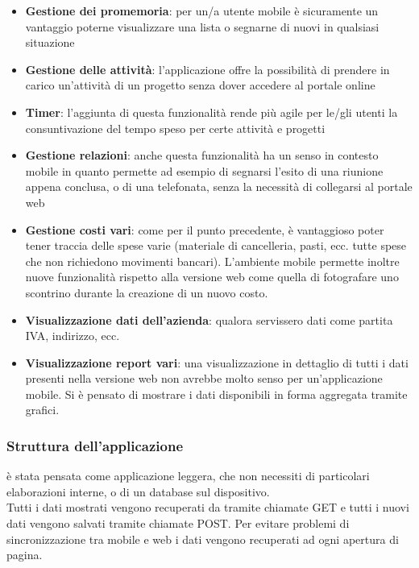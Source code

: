 \begin{itemize}
\item \textbf{Gestione dei promemoria}: per un/a utente mobile è sicuramente un vantaggio
poterne visualizzare una lista o segnarne di nuovi in qualsiasi situazione
\item \textbf{Gestione delle attività}: l'applicazione offre la possibilità di prendere
in carico un'attività di un progetto senza dover accedere al portale online
\item \textbf{Timer}: l'aggiunta di questa funzionalità rende più agile per le/gli utenti
la consuntivazione del tempo speso per certe attività e progetti
\item \textbf{Gestione relazioni}: anche questa funzionalità ha un senso in contesto mobile
in quanto permette ad esempio di segnarsi l'esito di una riunione appena conclusa, o di una
telefonata, senza la necessità di collegarsi al portale web
\item \textbf{Gestione costi vari}: come per il punto precedente, è vantaggioso poter tener
traccia delle spese varie (materiale di cancelleria, pasti, ecc. tutte spese che non
richiedono movimenti bancari). L'ambiente mobile permette inoltre nuove funzionalità rispetto
alla versione web come quella di fotografare uno scontrino durante la creazione di un nuovo
costo.
\item \textbf{Visualizzazione dati dell'azienda}: qualora servissero dati come partita IVA,
indirizzo, ecc.
\item \textbf{Visualizzazione report vari}: una visualizzazione in dettaglio di tutti i dati
presenti nella versione web non avrebbe molto senso per un'applicazione mobile. Si è pensato
di mostrare i dati disponibili in forma aggregata tramite grafici.
\end{itemize}

\subsubsection{Struttura dell'applicazione}
\fiscoloMobile{} è stata pensata come applicazione leggera, che non necessiti di particolari
elaborazioni interne, o di un database sul dispositivo. \\
Tutti i dati mostrati vengono recuperati da \fiscoloWeb{} tramite chiamate GET e tutti i
nuovi dati vengono salvati tramite chiamate POST. Per evitare problemi di sincronizzazione
tra mobile e web i dati vengono recuperati ad ogni apertura di pagina. \\

